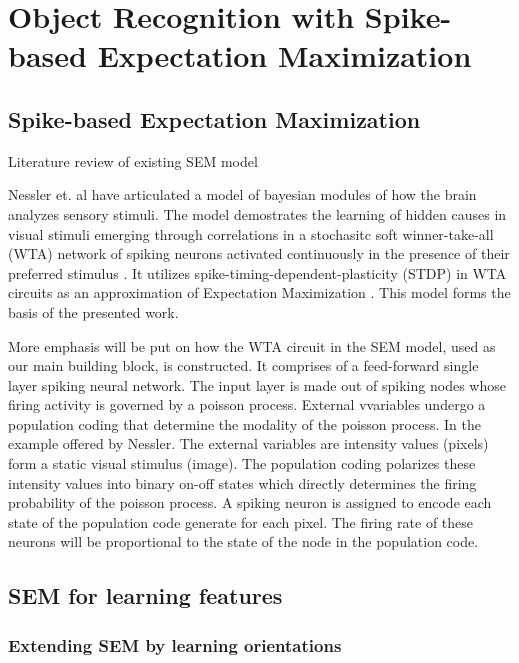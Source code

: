 \documentclass{report}
\begin{document}
\chapter{Object Recognition with Spike-based Expectation Maximization}

\section{Spike-based Expectation Maximization}

Literature review of existing SEM model

Nessler et. al have articulated a model of bayesian modules of how the brain analyzes sensory stimuli. The model demostrates the learning of hidden causes in visual stimuli emerging through correlations in a stochasitc soft winner-take-all (WTA) network of spiking neurons activated continuously in the presence of their preferred stimulus \cite{Nessler2010}. It utilizes spike-timing-dependent-plasticity (STDP) in WTA circuits as an approximation of Expectation Maximization \cite{Nessler2013}. This model forms the basis of the presented work.

More emphasis will be put on how the WTA circuit in the SEM model, used as our main building block, is constructed. It comprises of a feed-forward single layer spiking neural network. The input layer is made out of spiking nodes whose firing activity is governed  by a poisson process. External vvariables undergo a population coding that determine the modality of the poisson process. In the example offered by Nessler. The external variables are intensity values (pixels) form a static visual stimulus (image). The population coding polarizes these intensity values into binary on-off states which directly determines the firing probability of the poisson process. A spiking neuron is assigned to encode each state of the population code generate for each pixel. The firing rate of these neurons will be proportional to the state of the node in the population code. 

\section{SEM for learning features}

\subsection{Extending SEM by learning orientations}
\end{document}
